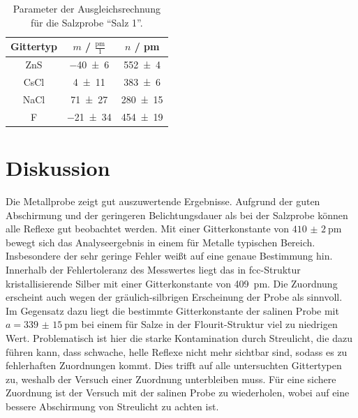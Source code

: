 \begin{table}[H]
  \centering
  \caption{Parameter der Ausgleichsrechnung für die Salzprobe \enquote{Salz 1}.}
  \label{Tab:Salz_Regression}
  \begin{tabular}{c | c c }
    \toprule
    Gittertyp &
    $m$ / $\frac{\mathrm{pm}}{1}$ &
    $n$ / pm \\
    \midrule
    ZnS & \num{-40(6)} & \num{552(4)} \\
    CsCl & \num{4(11)} & \num{383(6)} \\
    NaCl & \num{71(27)} & \num{280(15)} \\
    F & \num{-21(34)} & \num{454(19)} \\
    \bottomrule
  \end{tabular}
\end{table}

\section{Diskussion}
Die Metallprobe zeigt gut auszuwertende Ergebnisse. Aufgrund der guten Abschirmung
und der geringeren Belichtungsdauer als bei der Salzprobe können alle Reflexe gut
beobachtet werden. Mit einer Gitterkonstante von $\SI{410(2)}{\pico\metre}$
bewegt sich das Analyseergebnis in einem für Metalle typischen Bereich.
Insbesondere der sehr geringe Fehler weißt auf eine genaue Bestimmung hin.
Innerhalb der Fehlertoleranz des Messwertes liegt das in fcc-Struktur kristallisierende
Silber mit einer Gitterkonstante von \SI{409}{\pico\metre}\cite{AM}. Die Zuordnung erscheint
auch wegen der gräulich-silbrigen Erscheinung der Probe als sinnvoll.\\
Im Gegensatz dazu liegt die bestimmte Gitterkonstante der salinen Probe mit
$a=\SI{339(15)}{\pico\metre}$ bei einem für Salze in der Flourit-Struktur
viel zu niedrigen Wert. Problematisch ist hier
die starke Kontamination durch Streulicht, die dazu führen kann, dass schwache,
helle Reflexe nicht mehr sichtbar sind, sodass es zu fehlerhaften Zuordnungen kommt.
Dies trifft auf alle untersuchten Gittertypen zu, weshalb der Versuch einer
Zuordnung unterbleiben muss.
Für eine sichere Zuordnung ist der Versuch mit der salinen Probe zu wiederholen,
wobei auf eine bessere Abschirmung von Streulicht zu achten ist.
